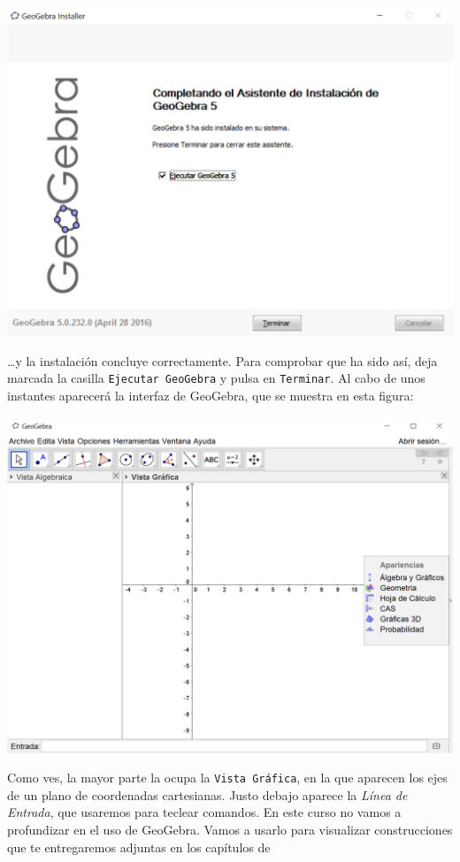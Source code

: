 \documentclass[10pt,a4paper]{article}\usepackage[]{graphicx}\usepackage[]{color}
\begin{document}
    \begin{center}
    \includegraphics[width=14cm]{../fig/Tut00-GeoGebraSetup05-201605.png}
    \end{center}
\ldots y la instalación concluye correctamente. Para comprobar que ha sido así, deja marcada la
casilla {\tt Ejecutar GeoGebra} y pulsa en {\tt Terminar}. Al cabo de unos instantes aparecerá la
interfaz de GeoGebra, que se muestra en esta figura:
    \begin{center}
    \includegraphics[width=15cm]{../fig/Tut00-GeoGebraSetup06-201605.png}
    \end{center}
Como ves, la mayor parte la ocupa la {\tt Vista Gráfica}, en la que aparecen los ejes de un plano
de coordenadas cartesianas.  Justo debajo aparece la {\em Línea de Entrada}, que usaremos para teclear comandos. En este curso no vamos a profundizar en el uso de GeoGebra. Vamos a usarlo para visualizar construcciones que te entregaremos adjuntas en los capítulos de
\end{document}
